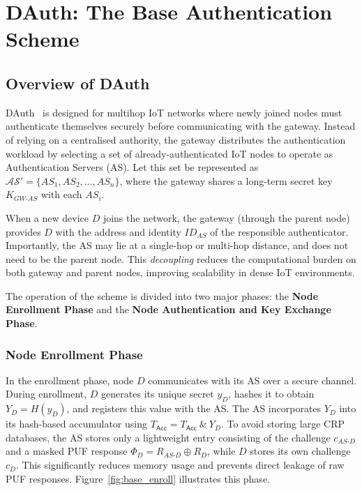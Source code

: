 \chapter{DAuth: The Base Authentication Scheme}

\section{Overview of DAuth}

DAuth~\cite{das2026comsnets} is designed for multihop IoT networks where
newly joined nodes must authenticate themselves securely before communicating with
the gateway.
Instead of relying on a centralised authority, the gateway distributes the
authentication workload by selecting a set of already-authenticated IoT nodes to
operate as Authentication Servers (AS).
Let this set be represented as $\mathcal{AS}' = \{AS_1, AS_2, \ldots, AS_n\}$,
where the gateway shares a long-term secret key $K_{GW\text{-}AS}$ with each $AS_i$.

When a new device $D$ joins the network, the gateway (through the parent node)
provides $D$ with the address and identity $ID_{AS}$ of the responsible
authenticator.
Importantly, the AS may lie at a single-hop or multi-hop distance, and does not need
to be the parent node.
This \emph{decoupling} reduces the computational burden on both gateway and parent
nodes, improving scalability in dense IoT environments.

The operation of the scheme is divided into two major phases: the
\textbf{Node Enrollment Phase} and the \textbf{Node Authentication and Key Exchange
Phase}.

\subsection{Node Enrollment Phase}

In the enrollment phase, node $D$ communicates with its AS over a secure channel.
During enrollment, $D$ generates its unique secret $y_D$, hashes it to obtain
$Y_D = H(y_D)$, and registers this value with the AS.
The AS incorporates $Y_D$ into its hash-based accumulator using
$T_{\mathsf{Acc}} = T_{\mathsf{Acc}}\ \&\ Y_D$.
To avoid storing large CRP databases, the AS stores only a lightweight entry
consisting of the challenge $c_{AS\text{-}D}$ and a masked PUF response
$\Phi_D = R_{AS\text{-}D} \oplus R_D$, while $D$ stores its own challenge $c_D$.
This significantly reduces memory usage and prevents direct leakage of raw PUF
responses.
Figure~\ref{fig:base_enroll} illustrates this phase.

